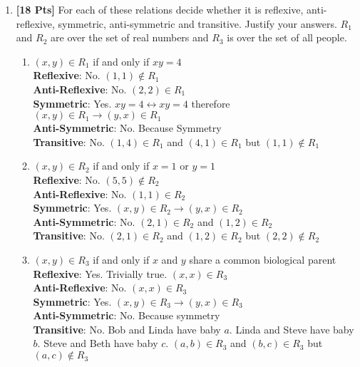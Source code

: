 \documentclass[11pt]{article}
\begin{document}
\begin{enumerate}

\item {\bf [18 Pts]} For each of these relations decide whether it is reflexive, anti-reflexive, symmetric, anti-symmetric and transitive. Justify your answers. $R_1$ and $R_2$ are over the set of real numbers and $R_3$ is over the set of all people.

\begin{enumerate}

\item $(x,y) \in R_1$ if and only if $xy = 4$\\
\textbf{Reflexive}: No. $(1,1) \notin R_1$\\
\textbf{Anti-Reflexive}: No. $(2,2) \in R_1$\\
\textbf{Symmetric}: Yes. $xy = 4 \leftrightarrow xy = 4$ therefore $(x,y) \in R_1 \rightarrow (y,x) \in R_1$\\
\textbf{Anti-Symmetric}: No. Because Symmetry\\
\textbf{Transitive}: No. $(1,4) \in R_1$ and $(4,1) \in R_1$ but $(1,1) \notin R_1$\\


\item $(x,y) \in R_2$ if and only if $x = 1$ or $y = 1$\\
\textbf{Reflexive}: No. $(5,5) \notin R_2$\\
\textbf{Anti-Reflexive}: No. $(1,1) \in R_2$\\
\textbf{Symmetric}: Yes. $(x,y) \in R_2 \rightarrow (y,x) \in R_2$\\
\textbf{Anti-Symmetric}: No. $(2,1) \in R_2$ and $(1,2) \in R_2$\\
\textbf{Transitive}: No. $(2,1) \in R_2$ and $(1,2) \in R_2$ but $(2,2) \notin R_2$\\


\item $(x,y) \in R_3$ if and only if $x$ and $y$ share a common biological parent\\
\textbf{Reflexive}: Yes. Trivially true. $(x,x) \in R_3$\\
\textbf{Anti-Reflexive}: No. $(x,x) \in R_3$\\
\textbf{Symmetric}: Yes. $(x,y) \in R_3 \rightarrow (y,x) \in R_3$\\
\textbf{Anti-Symmetric}: No. Because symmetry\\
\textbf{Transitive}: No. Bob and Linda have baby $a$. Linda and Steve have baby $b$. Steve and Beth have baby $c$. $(a,b) \in R_3$ and $(b,c) \in R_3$ but $(a,c) \notin R_3$



\end{enumerate}
\end{enumerate}
\end{document}
